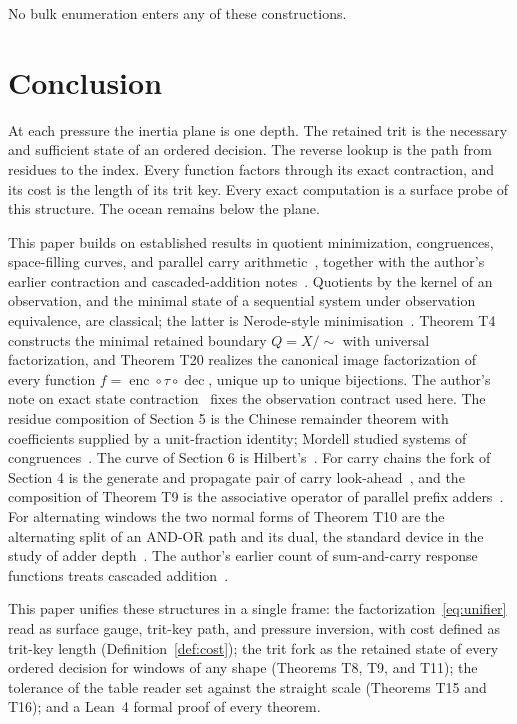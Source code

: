\documentclass[11pt,a4paper]{article}
\theoremstyle{definition}
\DeclareMathOperator{\dec}{dec}
\DeclareMathOperator{\enc}{enc}
\begin{document}
No bulk enumeration enters any of these constructions.

\section{Conclusion}
At each pressure the inertia plane is one depth. The retained trit is the necessary and sufficient state of an ordered decision. The reverse lookup is the path from residues to the index. Every function factors through its exact contraction, and its cost is the length of its trit key. Every exact computation is a surface probe of this structure. The ocean remains below the plane.

This paper builds on established results in quotient minimization, congruences, space-filling curves, and parallel carry arithmetic~\cite{nerode,mordell,hilbert,weinberger,brentkung,grinchuk,brennerhermann}, together with the author's earlier contraction and cascaded-addition notes~\cite{esc,cascade}. Quotients by the kernel of an observation, and the minimal state of a sequential system under observation equivalence, are classical; the latter is Nerode-style minimisation~\cite{nerode}. Theorem T4 constructs the minimal retained boundary $Q = X/{\sim}$ with universal factorization, and Theorem T20 realizes the canonical image factorization of every function $f = \enc \circ \tau \circ \dec$, unique up to unique bijections. The author's note on exact state contraction~\cite{esc} fixes the observation contract used here. The residue composition of Section 5 is the Chinese remainder theorem with coefficients supplied by a unit-fraction identity; Mordell studied systems of congruences~\cite{mordell}. The curve of Section 6 is Hilbert's~\cite{hilbert}. For carry chains the fork of Section 4 is the generate and propagate pair of carry look-ahead~\cite{weinberger}, and the composition of Theorem T9 is the associative operator of parallel prefix adders~\cite{brentkung}. For alternating windows the two normal forms of Theorem T10 are the alternating split of an AND-OR path and its dual, the standard device in the study of adder depth~\cite{grinchuk,brennerhermann}. The author's earlier count of sum-and-carry response functions treats cascaded addition~\cite{cascade}.

This paper unifies these structures in a single frame: the factorization~\eqref{eq:unifier} read as surface gauge, trit-key path, and pressure inversion, with cost defined as trit-key length (Definition~\ref{def:cost}); the trit fork as the retained state of every ordered decision for windows of any shape (Theorems T8, T9, and T11); the tolerance of the table reader set against the straight scale (Theorems T15 and T16); and a Lean~4 formal proof of every theorem.
\end{document}
